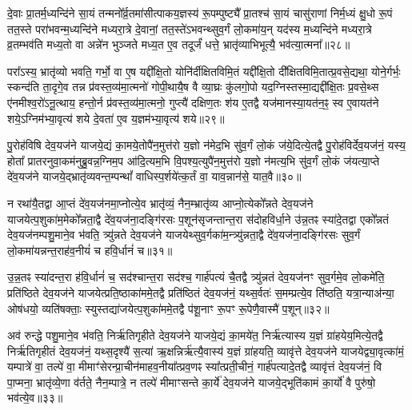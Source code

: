 दे॒वाः प्रा॒तर्म॒ध्यन्दि॑ने सा॒यं तन्मनो᳚र्व्र॒तमा॑सीत्पाकय॒ज्ञस्य॑ रू॒पम्पुष्ट्यै᳚ प्रा॒तश्च॑ सा॒यं चासु॑राणां निर्म॒ध्यं क्षु॒धो रू॒पं तत॒स्ते परा॑भवन्म॒ध्यन्दि॑ने मध्यरा॒त्रे दे॒वानां॒ तत॒स्ते॑\-ऽभवन्थ्सुव॒र्गं लो॒कमा॑य॒न् यद॑स्य म॒ध्यन्दि॑ने मध्यरा॒त्रे व्र॒तम्भव॑ति मध्य॒तो वा अन्ने॑न भुञ्जते मध्य॒त ए॒व तदूर्जं॑ धत्ते॒ भ्रातृ॑व्याभिभूत्यै॒ भव॑त्या॒त्मना᳚॥२८॥




परा᳚\-ऽस्य॒ भ्रातृ॑व्यो भवति॒ गर्भो॒ वा ए॒ष यद्दी᳚क्षि॒तो योनि॑र्दीक्षितविमि॒तं यद्दी᳚क्षि॒तो दी᳚क्षितविमि॒तात्प्र॒वसे॒द्यथा॒ योने॒र्गर्भः॒ स्कन्द॑ति ता॒दृगे॒व तन्न प्र॑वस्त॒व्य॑मा॒त्मनो॑ गोपी॒थायै॒ष वै व्या॒घ्रः कु॑लगो॒पो यद॒ग्निस्तस्मा॒द्यद्दी᳚क्षि॒तः प्र॒वसे॒थ्स ए॑नमीश्व॒रो॑\-ऽनू॒त्थाय॒ हन्तो॒र्न प्र॑वस्त॒व्य॑मा॒त्मनो॒ गुप्त्यै॑ दक्षिण॒तः श॑य ए॒तद्वै यज॑मानस्या॒यत॑न॒ꣴ॒ स्व ए॒वायत॑ने शये॒\-ऽग्निम॑भ्या॒वृत्य॑ शये दे॒वता॑ ए॒व य॒ज्ञम॑भ्या॒वृत्य॑ शये॥२९॥

{\anuvakamend[{ए॒तद्वै क्रू॒र इ॒वैक॑व्रता आ॒त्मना॒ यज॑मानस्य॒ त्रयो॑दश च॥५॥}]}

पु॒रोह॑विषि देव॒यज॑ने याजये॒द्यं का॒मये॒तोपै॑न॒मुत्त॑रो य॒ज्ञो न॑मेद॒भि सु॑व॒र्गं लो॒कं ज॑ये॒दित्ये॒तद्वै पु॒रोह॑विर्देव॒यज॑नं॒ यस्य॒ होता᳚ प्रातरनुवा॒कम॑नुब्रु॒वन्न॒ग्निम॒प आ॑दि॒त्यम॒भि वि॒पश्य॒त्युपै॑न॒मुत्त॑रो य॒ज्ञो न॑मत्य॒भि सु॑व॒र्गं लो॒कं ज॑यत्या॒प्ते दे॑व॒यज॑ने याजये॒द्भ्रातृ॑व्यवन्त॒म्पन्थां᳚ वाधिस्प॒र्\mbox{}शये॑त्क॒र्तं वा॒ याव॒न्नान॑से॒ यात॒वै॥३०॥

न रथा॑यै॒तद्वा आ॒प्तं दे॑व॒यज॑नमा॒प्नोत्ये॒व भ्रातृ॑व्यं॒ नैन॒म्भ्रातृ॑व्य आप्नो॒त्येको᳚न्नते देव॒यज॑ने याजयेत्प॒शुका॑म॒मेको᳚न्नता॒द्वै दे॑व॒यज॑ना॒दङ्गि॑रसः प॒शून॑सृजन्तान्त॒रा स॑दोहविर्धा॒ने उ॑न्न॒तꣴ स्या॑दे॒तद्वा एको᳚न्नतं देव॒यज॑नम्पशु॒माने॒व भ॑वति॒ त्र्यु॑न्नते देव॒यज॑ने याजयेथ्सुव॒र्गका॑म॒न्त्र्यु॑न्नता॒द्वै दे॑व॒यज॑ना॒दङ्गि॑रसः सुव॒र्गं लो॒कमा॑यन्नन्त॒राह॑व॒नीयं॑ च हवि॒र्धानं॑ च॥३१॥

उ॒न्न॒तꣴ स्या॑दन्त॒रा ह॑वि॒र्धानं॑ च॒ सद॑श्चान्त॒रा सद॑श्च॒ गार्\mbox{}ह॑पत्यं चै॒तद्वै त्र्यु॑न्नतं देव॒यज॑नꣳ सुव॒र्गमे॒व लो॒कमे॑ति॒ प्रति॑ष्ठिते देव॒यज॑ने याजयेत्प्रति॒ष्ठाका॑ममे॒तद्वै प्रति॑ष्ठितं देव॒यज॑नं॒ यथ्स॒र्वतः॑ स॒मम्प्रत्ये॒व ति॑ष्ठति॒ यत्रा॒न्याअ॑न्या॒ ओष॑धयो॒ व्यति॑षक्ताः॒ स्युस्तद्या॑जयेत्प॒शुका॑ममे॒तद्वै प॑शू॒नाꣳ रू॒पꣳ रू॒पेणै॒वास्मै॑ प॒शून्॥३२॥

अव॑ रुन्द्धे पशु॒माने॒व भ॑वति॒ निर्\mbox{}ऋ॑तिगृहीते देव॒यज॑ने याजये॒द्यं का॒मये॑त॒ निर्\mbox{}ऋ॑त्यास्य य॒ज्ञं ग्रा॑हयेय॒मित्ये॒तद्वै निर्\mbox{}ऋ॑तिगृहीतं देव॒यज॑नं॒ यथ्स॒दृश्यै॑ स॒त्या॑ ऋ॒क्षन्निर्\mbox{}ऋ॑त्यै॒वास्य॑ य॒ज्ञं ग्रा॑हयति॒ व्यावृ॑त्ते देव॒यज॑ने याजयेद्व्या॒वृत्का॑मं॒ यम्पात्रे॑ वा॒ तल्पे॑ वा॒ मीमाꣳ॑सेरन्प्रा॒चीन॑माहव॒नीया᳚त्प्रव॒णꣴ स्या᳚त्प्रती॒चीनं॒ गार्\mbox{}ह॑पत्यादे॒तद्वै व्यावृ॑त्तं देव॒यज॑नं॒ वि पा॒प्मना॒ भ्रातृ॑व्ये॒णा व॑र्तते॒ नैन॒म्पात्रे॒ न तल्पे॑ मीमाꣳसन्ते का॒र्ये॑ देव॒यज॑ने याजये॒द्भूति॑कामं का॒र्यो॑ वै पुरु॑षो॒ भव॑त्ये॒व॥३३॥

